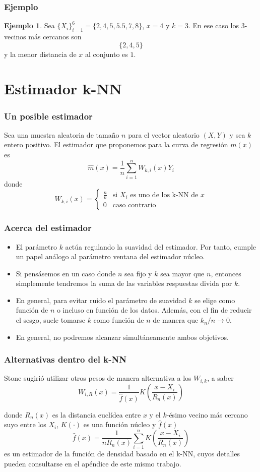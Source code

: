 \documentclass{beamer}
\theoremstyle{definition}
\newtheorem{ejem}{Ejemplo}
\begin{document}
\begin{frame}
\frametitle{Ejemplo}
\begin{ejem}
Sea $\{X_i\}_{i=1}^6 = \{2,4,5,5.5,7,8\}$, $x=4$ y $k=3$. En ese caso los $3$-vecinos más cercanos son
$$
\{2,4,5\}
$$
y la menor distancia de $x$ al conjunto es $1$.
\end{ejem}
\end{frame}

\section{Estimador k-NN}
\begin{frame}
\frametitle{Un posible estimador}
Sea una muestra aleatoria de tamaño $n$ para el vector aleatorio $(X,Y)$ y sea $k$ entero positivo. El estimador que proponemos para la curva de regresión $m(x)$ es
$$
\hat{m}(x)=\frac{1}{n}\sum_{i=1}^n W_{k,i}(x)Y_i
$$
donde 
$$
W_{k,i}(x) = \begin{cases}
\frac{n}{k} & \text{si $X_i$ es uno de los k-NN de $x$}\\
0 & \text{caso contrario}
\end{cases}
$$
\end{frame}

\begin{frame}
\frametitle{Acerca del estimador}
\begin{itemize}
\item El parámetro $k$ actúa regulando la suavidad del estimador. Por tanto, cumple un papel análogo al parámetro ventana del estimador núcleo.
\item Si pensásemos en un caso donde $n$ sea fijo y $k$ sea mayor que $n$, entonces simplemente tendremos la suma de las variables respuestas divida por $k$.
\item En general, para evitar ruido el parámetro de suavidad $k$ se elige como función de $n$ o incluso en función de los datos. Además, con el fin de reducir el sesgo, suele tomarse $k$ como función de $n$ de manera que $k_n/n\to 0$.
\item En general, no podremos alcanzar simultáneamente ambos objetivos.
\end{itemize}
\end{frame}
\begin{frame}
\frametitle{Alternativas dentro del k-NN}
Stone sugirió utilizar otros pesos de manera alternativa a los $W_{i,k}$, a saber
$$
W_{i,R}(x)=\frac{1}{\hat{f}(x)}K\left(\frac{x-X_i}{R_n(x)}\right)
$$

donde $R_n(x)$ es la distancia euclídea entre $x$ y el $k$-ésimo vecino más cercano suyo entre los $X_i$, $K(\cdot)$ es una función núcleo y $\hat{f}(x)$ 
$$
\hat{f}(x) = \frac{1}{nR_n(x)}\sum_{i=1}^n K\left(\frac{x-X_i}{R_n(x)}\right)
$$
es un estimador de la función de densidad basado en el k-NN, cuyos detalles pueden consultarse en el apéndice de este mismo trabajo. 
\end{frame}
\end{document}
